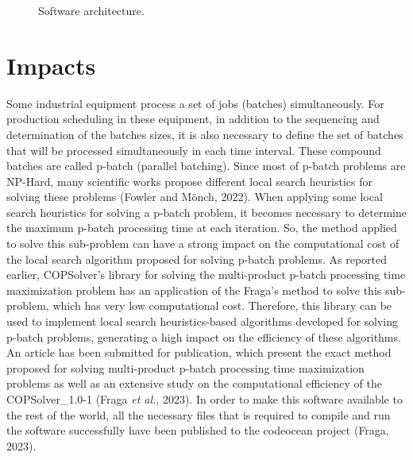 \documentclass[11pt, letterpaper]{article}
\begin{document}
\begin{figure}[h]
\begin{center}
\end{center}
\caption{Software architecture.}
\end{figure}

\section{Impacts}

Some industrial equipment process a set of jobs (batches) simultaneously. For production scheduling in these equipment, in addition to the sequencing and determination of the batches sizes, it is also necessary to define the set of batches that will be processed simultaneously in each time interval. These compound batches are called p-batch (parallel batching). Since most of p-batch problems are NP-Hard, many scientific works propose different local search heuristics for solving these problems (Fowler and Mönch, 2022). When applying some local search heuristics for solving a p-batch problem, it becomes necessary to determine the maximum p-batch processing time at each iteration. So, the method applied to solve this sub-problem can have a strong impact on the computational cost of the local search algorithm proposed for solving p-batch problems. As reported earlier, COPSolver's library for solving the multi-product p-batch processing time maximization problem has an application of the Fraga's method to solve this sub-problem, which has very low computational cost. Therefore, this library can be used to implement local search heuristics-based algorithms developed for solving p-batch problems, generating a high impact on the efficiency of these algorithms. An article has been submitted for publication, which present the exact method proposed for solving multi-product p-batch processing time maximization problems as well as an extensive study on the computational efficiency of the COPSolver\_1.0-1 (Fraga \emph{et al.}, 2023). In order to make this software available to the rest of the world, all the necessary files that is required to compile and run the software successfully have been published to the codeocean project (Fraga, 2023).
\end{document}
